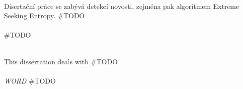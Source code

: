  





\cleardoublepage
\thispagestyle{empty}

 \\ [5mm]
Disertační práce se zabývá detekcí novosti, zejména pak algoritmem Extreme Seeking Entropy. \#TODO \\ [5mm]
  \\ [5mm] 
\#TODO

\cleardoublepage
\thispagestyle{empty}


\cleardoublepage
\thispagestyle{empty}

 \\ [5mm] 
This dissertation deals with \#TODO
\\ [5mm]



  \\ [5mm]
{\it WORD}
\#TODO



\cleardoublepage
\tableofcontents
\thispagestyle{empty}


\cleardoublepage
\thispagestyle{empty}

